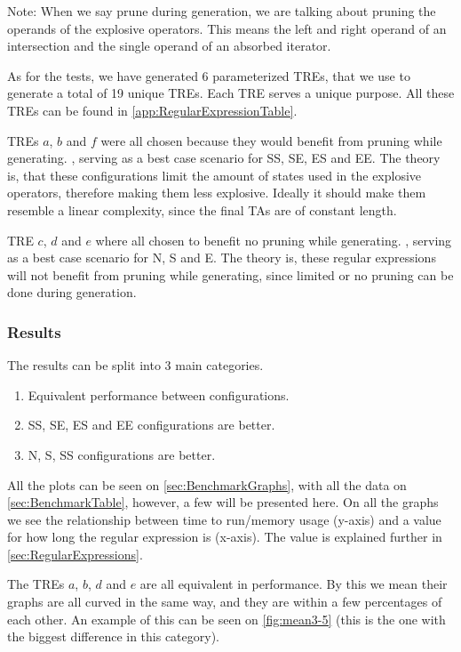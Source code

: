 Note: When we say prune during generation, we are talking about pruning the operands of the explosive operators.
This means the left and right operand of an intersection and the single operand of an absorbed iterator.

As for the tests, we have generated 6 parameterized TREs, that we use to generate a total of 19 unique TREs.
Each TRE serves a unique purpose.
All these TREs can be found in \cref{app:RegularExpressionTable}.

TREs $a$, $b$ and $f$ were all chosen because they would benefit from pruning while generating.
, serving as a best case scenario for SS, SE, ES and EE.
The theory is, that these configurations limit the amount of states used in the explosive operators, therefore making them less explosive.
Ideally it should make them resemble a linear complexity, since the final TAs are of constant length.

TRE $c$, $d$ and $e$ where all chosen to benefit no pruning while generating.
, serving as a best case scenario for N, S and E.
The theory is, these regular expressions will not benefit from pruning while generating, since limited or no pruning can be done during generation.

\subsubsection{Results}
The results can be split into 3 main categories.

\begin{enumerate}
    \item Equivalent performance between configurations.
    \item SS, SE, ES and EE configurations are better.
    \item N, S, SS configurations are better.
\end{enumerate}

All the plots can be seen on \cref{sec:BenchmarkGraphs}, with all the data on \cref{sec:BenchmarkTable}, however, a few will be presented here.
On all the graphs we see the relationship between time to run/memory usage (y-axis) and a value for how long the regular expression is (x-axis). The value is explained further in \cref{sec:RegularExpressions}.

The TREs $a$, $b$, $d$ and $e$ are all equivalent in performance.
By this we mean their graphs are all curved in the same way, and they are within a few percentages of each other.
An example of this can be seen on \cref{fig:mean3-5} (this is the one with the biggest difference in this category).

